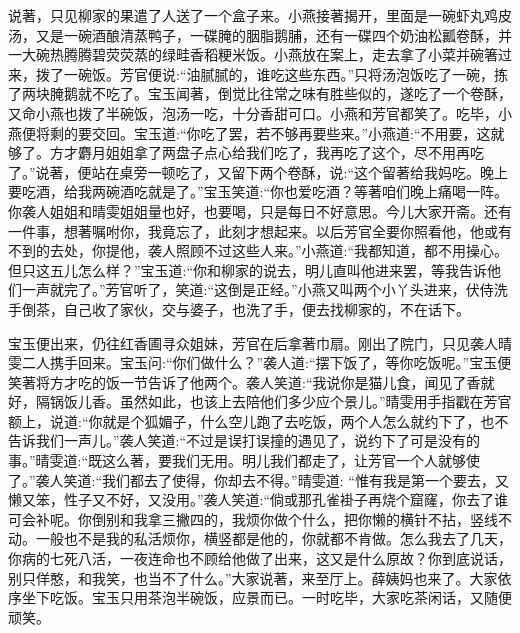 \begin{parag}
    说著，只见柳家的果遣了人送了一个盒子来。小燕接著揭开，里面是一碗虾丸鸡皮汤，又是一碗酒酿清蒸鸭子，一碟腌的胭脂鹅脯，还有一碟四个奶油松瓤卷酥，并一大碗热腾腾碧荧荧蒸的绿畦香稻粳米饭。小燕放在案上，走去拿了小菜并碗箸过来，拨了一碗饭。芳官便说:“油腻腻的，谁吃这些东西。”只将汤泡饭吃了一碗，拣了两块腌鹅就不吃了。宝玉闻著，倒觉比往常之味有胜些似的，遂吃了一个卷酥，又命小燕也拨了半碗饭，泡汤一吃，十分香甜可口。小燕和芳官都笑了。吃毕，小燕便将剩的要交回。宝玉道:“你吃了罢，若不够再要些来。”小燕道:“不用要，这就够了。方才麝月姐姐拿了两盘子点心给我们吃了，我再吃了这个，尽不用再吃了。”说著，便站在桌旁一顿吃了，又留下两个卷酥，说:“这个留著给我妈吃。晚上要吃酒，给我两碗酒吃就是了。”宝玉笑道:“你也爱吃酒？等著咱们晚上痛喝一阵。你袭人姐姐和晴雯姐姐量也好，也要喝，只是每日不好意思。今儿大家开斋。还有一件事，想著嘱咐你，我竟忘了，此刻才想起来。以后芳官全要你照看他，他或有不到的去处，你提他，袭人照顾不过这些人来。”小燕道:“我都知道，都不用操心。但只这五儿怎么样？”宝玉道:“你和柳家的说去，明儿直叫他进来罢，等我告诉他们一声就完了。”芳官听了，笑道:“这倒是正经。”小燕又叫两个小丫头进来，伏侍洗手倒茶，自己收了家伙，交与婆子，也洗了手，便去找柳家的，不在话下。
\end{parag}


\begin{parag}
    宝玉便出来，仍往红香圃寻众姐妹，芳官在后拿著巾扇。刚出了院门，只见袭人晴雯二人携手回来。宝玉问:“你们做什么？”袭人道:“摆下饭了，等你吃饭呢。”宝玉便笑著将方才吃的饭一节告诉了他两个。袭人笑道:“我说你是猫儿食，闻见了香就好，隔锅饭儿香。虽然如此，也该上去陪他们多少应个景儿。”晴雯用手指戳在芳官额上，说道:“你就是个狐媚子，什么空儿跑了去吃饭，两个人怎么就约下了，也不告诉我们一声儿。”袭人笑道:“不过是误打误撞的遇见了，说约下了可是没有的事。”晴雯道:“既这么著，要我们无用。明儿我们都走了，让芳官一个人就够使了。”袭人笑道:“我们都去了使得，你却去不得。”晴雯道: “惟有我是第一个要去，又懒又笨，性子又不好，又没用。”袭人笑道:“倘或那孔雀褂子再烧个窟窿，你去了谁可会补呢。你倒别和我拿三撇四的，我烦你做个什么，把你懒的横针不拈，竖线不动。一般也不是我的私活烦你，横竖都是他的，你就都不肯做。怎么我去了几天，你病的七死八活，一夜连命也不顾给他做了出来，这又是什么原故？你到底说话，别只佯憨，和我笑，也当不了什么。”大家说著，来至厅上。薛姨妈也来了。大家依序坐下吃饭。宝玉只用茶泡半碗饭，应景而已。一时吃毕，大家吃茶闲话，又随便顽笑。
\end{parag}


